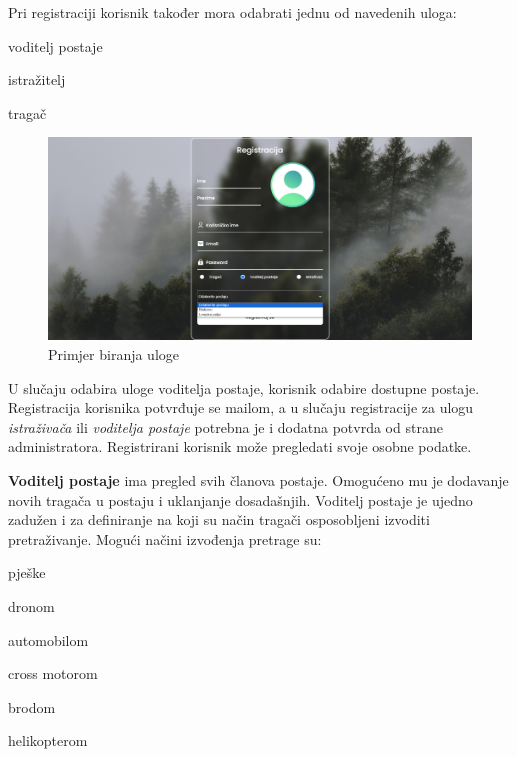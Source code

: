 		Pri registraciji korisnik također mora odabrati jednu od navedenih uloga:
		\begin{packed_item}
			\item voditelj postaje
			\item istražitelj
			\item tragač
		\end{packed_item}
		
		\begin{figure}[H]
			\includegraphics{slike/biranje_uloge.PNG} %
			\centering
			\caption{Primjer biranja uloge}
			\label{fig:promjene}
		\end{figure}
		
		U slučaju odabira uloge voditelja postaje, korisnik odabire dostupne postaje.
		Registracija korisnika potvrđuje se mailom, a u slučaju registracije za ulogu \textit{istraživača} ili \textit{voditelja postaje} potrebna je i dodatna potvrda od strane administratora.
		Registrirani korisnik može pregledati svoje osobne podatke.
		
		\textbf{Voditelj postaje} ima pregled svih članova postaje. Omogućeno mu je dodavanje novih tragača u postaju i uklanjanje dosadašnjih. Voditelj postaje je ujedno zadužen i za definiranje na koji su način tragači osposobljeni izvoditi pretraživanje. Mogući načini izvođenja pretrage su:
		
		\begin{packed_item}
			\item pješke
			\item dronom
			\item automobilom
			\item cross motorom
			\item brodom
			\item helikopterom
		\end{packed_item}
		

